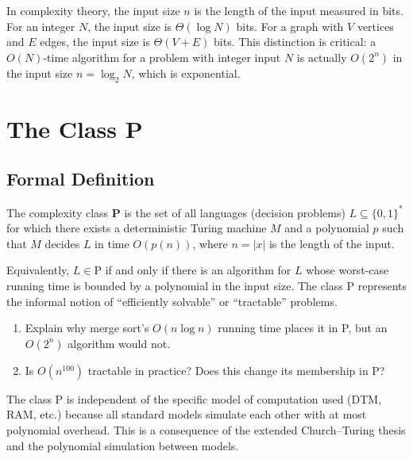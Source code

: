 \begin{remark}
In complexity theory, the input size $n$ is the length of the input measured in bits. For an integer $N$, the input size is $\Theta(\log N)$ bits. For a graph with $V$ vertices and $E$ edges, the input size is $\Theta(V + E)$ bits. This distinction is critical: a $O(N)$-time algorithm for a problem with integer input $N$ is actually $O(2^n)$ in the input size $n = \log_2 N$, which is exponential.
\end{remark}

\section{The Class P}

\subsection{Formal Definition}

\begin{definition}[P]
The complexity class \textbf{P} is the set of all languages (decision problems) $L \subseteq \{0,1\}^*$ for which there exists a deterministic Turing machine $M$ and a polynomial $p$ such that $M$ decides $L$ in time $O(p(n))$, where $n = |x|$ is the length of the input.
\end{definition}

Equivalently, $L \in \text{P}$ if and only if there is an algorithm for $L$ whose worst-case running time is bounded by a polynomial in the input size. The class P represents the informal notion of ``efficiently solvable'' or ``tractable'' problems.

\begin{checkyou}
\begin{enumerate}
  \item Explain why merge sort's $O(n \log n)$ running time places it in P, but an $O(2^n)$ algorithm would not.
  \item Is $O(n^{100})$ tractable in practice? Does this change its membership in P?
\end{enumerate}
\end{checkyou}

\begin{remark}
The class P is independent of the specific model of computation used (DTM, RAM, etc.) because all standard models simulate each other with at most polynomial overhead. This is a consequence of the extended Church--Turing thesis and the polynomial simulation between models.
\end{remark}

